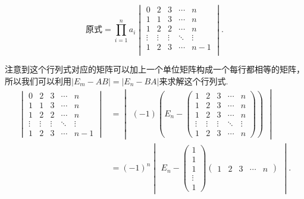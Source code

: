 \begin{solution}
    \[ \text{原式}=\prod_{i=1}^na_i \begin{vmatrix}
            0      & 2      & 3      & \cdots & n      \\
            1      & 1      & 3      & \cdots & n      \\
            1      & 2      & 2      & \cdots & n      \\
            \vdots & \vdots & \vdots & \ddots & \vdots \\
            1      & 2      & 3      & \cdots & n-1    \\
        \end{vmatrix}. \]

    注意到这个行列式对应的矩阵可以加上一个单位矩阵构成一个每行都相等的矩阵，所以我们可以利用$|E_m-AB|=|E_n-BA|$来求解这个行列式.
    \begin{align*}
        \begin{vmatrix}
            0      & 2      & 3      & \cdots & n      \\
            1      & 1      & 3      & \cdots & n      \\
            1      & 2      & 2      & \cdots & n      \\
            \vdots & \vdots & \vdots & \ddots & \vdots \\
            1      & 2      & 3      & \cdots & n-1
        \end{vmatrix}
         & = \begin{vmatrix}(-1)\left(E_n-\begin{pmatrix}
                1      & 2      & 3      & \cdots & n      \\
                1      & 2      & 3      & \cdots & n      \\
                1      & 2      & 3      & \cdots & n      \\
                \vdots & \vdots & \vdots & \ddots & \vdots \\
                1      & 2      & 3      & \cdots & n
            \end{pmatrix}\right)\end{vmatrix} \\
         & =(-1)^n\begin{vmatrix}E_n-
                      \begin{pmatrix}
                1 \\1\\1\\\vdots\\1
            \end{pmatrix}\begin{pmatrix}1 & 2 & 3 & \cdots & n\end{pmatrix}\end{vmatrix}.
    \end{align*}


\end{solution}
